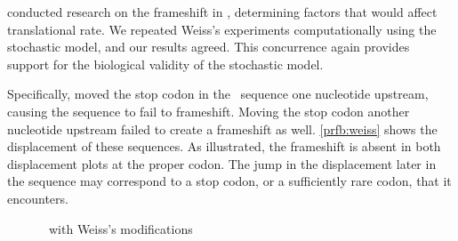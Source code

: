 \documentclass[12pt]{article}
\numberwithin{equation}{section}
\begin{document}
\citet{weiss87,weiss88} conducted research on the
frameshift in \prfB, determining factors that would affect
translational rate.  We repeated Weiss's experiments computationally
using the stochastic model, and our results agreed.
This concurrence again provides support for the biological validity of
the stochastic model.

Specifically, \citeauthor{weiss87} moved the stop codon in the
\prfB\ sequence one nucleotide upstream, causing the sequence to fail to
frameshift. Moving the stop codon another nucleotide upstream failed
to create a frameshift as well. \autoref{prfb:weiss}
shows the displacement of these sequences.  As illustrated,
the frameshift is absent in both displacement plots at the proper codon.
The jump in the displacement later in the sequence may correspond to a
stop codon, or a sufficiently rare codon, that it encounters.

\begin{figure}
    \centering
    \caption{\prfB\ with Weiss's modifications}
    \label{prfb:weiss}
\end{figure}
\end{document}
